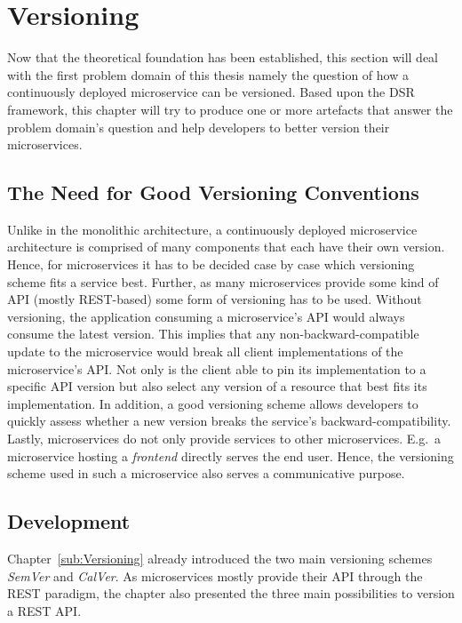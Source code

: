 
\section{Versioning}%
\label{sec:Versioning}

Now that the theoretical foundation has been established, this section will
deal with the first problem domain of this thesis namely the question of how a
continuously deployed microservice can be versioned. Based upon the \ac{DSR}
framework, this chapter will try to produce one or more artefacts that answer
the problem domain's question and help developers to better version their
microservices.

\subsection{The Need for Good Versioning Conventions}%
\label{sub:The_Need_for_Good_Versioning_Conventions}
Unlike in the monolithic architecture, a continuously deployed microservice
architecture is comprised of many components that each have their own version.
Hence, for microservices it has to be decided case by case which versioning
scheme fits a service best. Further, as many microservices provide some kind of
\ac{API} (mostly \ac{REST}-based) some form of versioning has to be used.
Without versioning, the application consuming a microservice's \ac{API} would
always consume the latest version. This implies that any
non-backward-compatible update to the microservice would break all client
implementations of the microservice's \ac{API}. Not only is the client able to
pin its implementation to a specific \ac{API} version but also select any
version of a resource that best fits its implementation. In addition, a good
versioning scheme allows developers to quickly assess whether a new version
breaks the service's backward-compatibility. Lastly, microservices do not only
provide services to other microservices. E.g.\ a microservice hosting a
\textit{frontend} directly serves the end user. Hence, the versioning scheme
used in such a microservice also serves a communicative purpose.

\subsection{Development}%
\label{sub:Successfully_Implementing_Versioning}
Chapter~\ref{sub:Versioning} already introduced the two main versioning schemes
\textit{SemVer} and \textit{CalVer}. As microservices mostly provide their
\ac{API} through the \ac{REST} paradigm, the chapter also presented the three
main possibilities to version a \ac{REST} \ac{API}.

